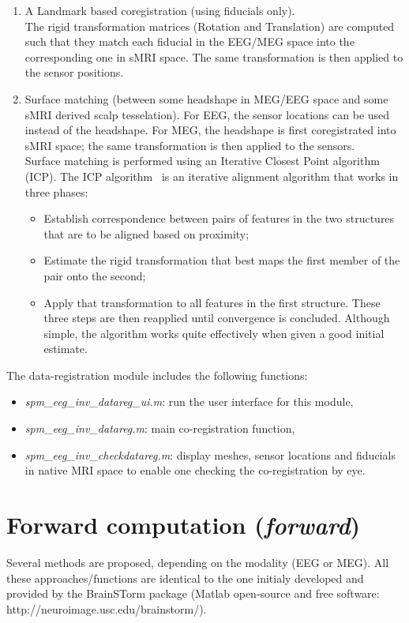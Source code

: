 \begin{enumerate}
    \item A Landmark based coregistration (using fiducials only).\\
    The rigid transformation matrices (Rotation and Translation) are computed such that they match each fiducial in the EEG/MEG space into the corresponding one in sMRI space. The same                    transformation is then applied to the sensor positions.
    \item Surface matching (between some headshape in MEG/EEG space and some sMRI derived scalp tesselation).
For EEG, the sensor locations can be used instead of the headshape. For MEG, the headshape is first coregistrated into sMRI space; the same transformation is then applied to the sensors.\\
Surface matching is performed using an Iterative Closest Point algorithm (ICP). The ICP algorithm~\cite{Besl_McKay} is an iterative alignment algorithm that works in three phases:
\begin{itemize}
    \item Establish correspondence between pairs of features in the two structures that are to be aligned based on proximity;
    \item Estimate the rigid transformation that best maps the first member of the pair onto the second;
    \item Apply that transformation to all features in the first structure. These three steps are then reapplied until convergence is concluded.
Although simple, the algorithm works quite effectively when given a good initial estimate.
\end{itemize}
\end{enumerate}

The data-registration module includes the following functions:
\begin{itemize}
    \item \textit{spm\_eeg\_inv\_datareg\_ui.m}: run the user interface for this module,
    \item \textit{spm\_eeg\_inv\_datareg.m}:    main co-registration function,
    \item \textit{spm\_eeg\_inv\_checkdatareg.m}: display meshes, sensor locations and fiducials in native MRI space to enable one checking the co-registration by eye.
\end{itemize}


\section{Forward computation (\textit{forward})}
Several methods are proposed, depending on the modality (EEG or MEG). All these approaches/functions are identical to the one initialy developed and provided by the BrainSTorm package (Matlab open-source and free software: http://neuroimage.usc.edu/brainstorm/).

